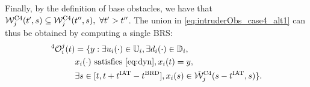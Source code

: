 \begin{itemize}[leftmargin=*]
Finally, by the definition of base obstacles, we have that $\mathcal{W}_j^{\text{C4}}(t', s) \subseteq \mathcal{W}_j^{\text{C4}}(t'', s), ~\forall t' > t''$. The union in \eqref{eq:intruderObs_case4_alt1} can thus be obtained by computing a single BRS:
\begin{equation} \label{eq:intruderObs_case4} 
\begin{aligned}
^4\ioset_i^j(t) & = \{y: \exists \ctrl_i(\cdot) \in \cfset_i, \exists \dstb_i(\cdot) \in \dfset_i, \\
& \state_i(\cdot) \text{ satisfies \eqref{eq:dyn}}, \state_i(t) = y, \\
& \exists s \in [t, t + \iat - \brd], \state_i(s) \in \tilde{\frs}_j^{\text{C4}}(s-\iat, s)\}.
\end{aligned}
\end{equation}
\end{itemize}


